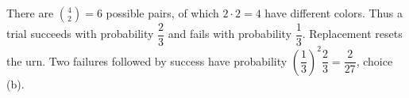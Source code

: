 There are $\binom42=6$ possible pairs, of which $2\cdot2=4$ have different colors. Thus a trial succeeds with probability $\dfrac{2}{3}$ and fails with probability $\dfrac{1}{3}$. Replacement resets the urn. Two failures followed by success have probability $(\dfrac{1}{3})^2\dfrac{2}{3}=\boxed{\dfrac{2}{27}}$, choice (b).
